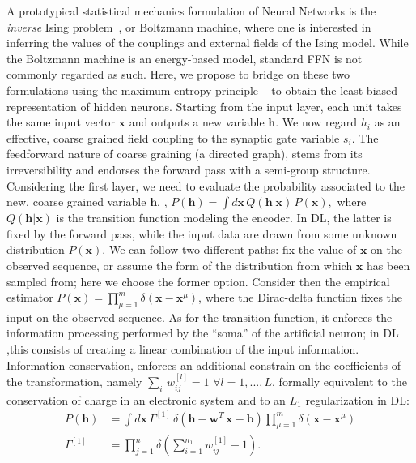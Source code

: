 \documentclass{article}
\begin{document}
A prototypical statistical mechanics formulation of Neural Networks is the {\it inverse} Ising problem~\cite{zecchina}, or Boltzmann machine, where one is interested in inferring the values of the couplings and external fields of the Ising model.  While the Boltzmann machine is an energy-based model, standard FFN is not commonly regarded as such. Here, we propose to bridge on these two formulations using the maximum entropy principle ~\cite{zecchina, roberto, mckay, jaynes} to obtain the least biased representation of hidden neurons. Starting from the input layer, each unit takes the same input vector $\mathbf{x}$ and outputs a new variable $\mathbf{h}$. We now regard $h_i$ as an effective, coarse grained field coupling to the synaptic gate variable $s_i$. The feedforward nature of coarse graining (a directed graph), stems from its irreversibility and endorses the forward pass with a semi-group structure. Considering the first layer, we need to evaluate the probability associated to the new, coarse grained variable $\mathbf{h}$, , $P(\mathbf{h}) =  \int d \mathbf{x} \, Q(\mathbf{h} | \mathbf{x} ) \, P(\mathbf{x}),$
%
%
where  $Q(\mathbf{h} | \mathbf{x} )$ is the transition function modeling the encoder. In DL, the latter is fixed by the forward pass, while the input data are drawn from some unknown distribution $P(\mathbf{x})$. We can follow two different paths: fix the value of $\mathbf{x}$ on the observed sequence, or assume the form of the distribution from which $\mathbf{x}$ has been sampled from; here we choose the former option. Consider then the empirical estimator $P(\mathbf{x}) =  \prod_{\mu=1}^m  \delta( \mathbf{x} - \mathbf{x}^{\mu} )$, where the Dirac-delta function  fixes the input on the observed sequence. As for the transition function, it enforces the information processing performed by the ``soma'' of the artificial neuron; in  DL ,this consists of creating a linear combination of the input information. Information conservation, enforces an additional constrain on the coefficients of the transformation, namely $\sum_i \, w_{ij}^{[l]} =1$ $\forall l = 1, ..., L$, formally equivalent to the conservation of charge in an electronic system and to an $L_1$ regularization in DL:
%
\begin{align} \label{eq:ps2}
P(\mathbf{h}) &= \int {d\mathbf{x}} \, \Gamma^{[1]} \, \delta\left( \mathbf{h} -  \mathbf{w}^{T} \, \mathbf{x} - \mathbf{b} \right) \prod_{\mu =1}^m  \delta ( \mathbf{x} - \mathbf{x}^{\mu} )  \\ \nonumber
\Gamma^{[1]} &= \prod_{j=1}^n \delta\left( \sum_{i=1}^{n_1} w_{ij}^{[1]} -1 \right) .
\end{align}
\end{document}
